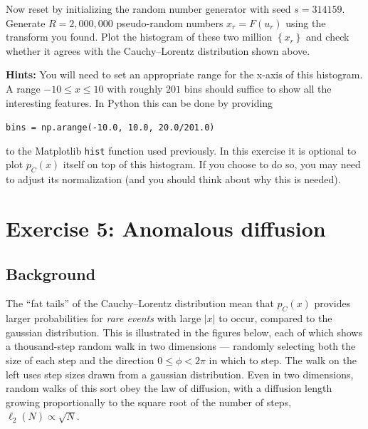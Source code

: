 \documentclass[12 pt]{article} %
\newcommand{\showmarks}[1]{\rightline{\texttt{[#1 marks]}}} %
\begin{document}
\showmarks{6}

Now reset by initializing the random number generator with seed $s = 314159$. %
Generate $R = 2{,}000{,}000$ pseudo-random numbers $x_r = F(u_r)$ using the transform you found.
Plot the histogram of these two million $\left\{x_r\right\}$ and check whether it agrees with the Cauchy--Lorentz distribution shown above.

\textbf{Hints:} You will need to set an appropriate range for the x-axis of this histogram.
A range $-10 \leq x \leq 10$ with roughly $201$ bins should suffice to show all the interesting features.
In Python this can be done by providing \\
\centerline{\texttt{bins = np.arange(-10.0, 10.0, 20.0/201.0)}}
to the Matplotlib \texttt{hist} function used previously.
In this exercise it is optional to plot $p_C(x)$ itself on top of this histogram.
If you choose to do so, you may need to adjust its normalization (and you should think about why this is needed).

\showmarks{8}



\newpage %
\section*{Exercise 5: Anomalous diffusion}
\subsection*{Background}
The ``fat tails'' of the Cauchy--Lorentz distribution mean that $p_C(x)$ provides larger probabilities for \textit{rare events} with large $|x|$ to occur, compared to the gaussian distribution.
This is illustrated in the figures below, each of which shows a thousand-step random walk in two dimensions --- randomly selecting both the size of each step and the direction $0 \leq \phi < 2\pi$ in which to step.
The walk on the left uses step sizes drawn from a gaussian distribution.
Even in two dimensions, random walks of this sort obey the law of diffusion, with a diffusion length growing proportionally to the square root of the number of steps, $\ell_2(N) \propto \sqrt{N}$.
\end{document}
